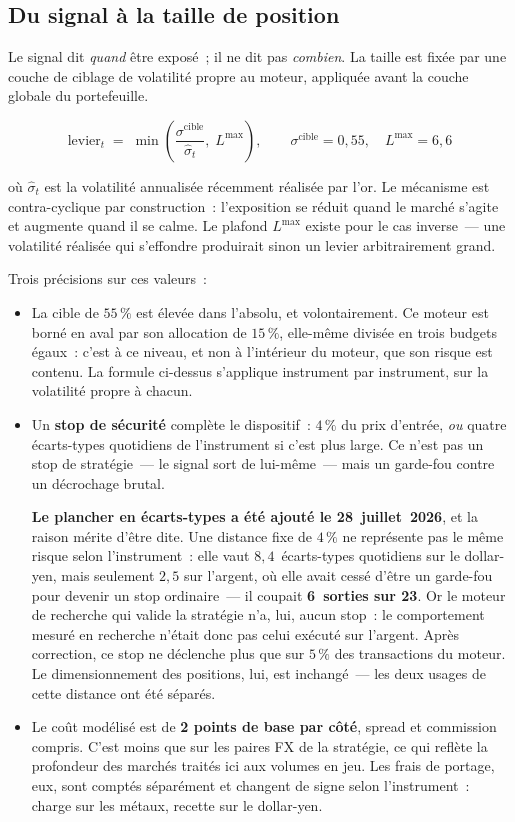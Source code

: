 \subsection{Du signal à la taille de position}

Le signal dit \emph{quand} être exposé~; il ne dit pas \emph{combien}. La taille est fixée par une couche de ciblage de volatilité propre au moteur, appliquée avant la couche globale du portefeuille.

\begin{equation*}
\text{levier}_t \;=\; \min\!\left(\frac{\sigma^{\text{cible}}}{\hat{\sigma}_t},\; L^{\max}\right),
\qquad \sigma^{\text{cible}} = 0{,}55, \quad L^{\max} = 6{,}6
\end{equation*}

où $\hat{\sigma}_t$ est la volatilité annualisée récemment réalisée par l'or. Le mécanisme est contra-cyclique par construction~: l'exposition se réduit quand le marché s'agite et augmente quand il se calme. Le plafond $L^{\max}$ existe pour le cas inverse~--- une volatilité réalisée qui s'effondre produirait sinon un levier arbitrairement grand.

Trois précisions sur ces valeurs~:

\begin{itemize}
\item La cible de $55\,\%$ est élevée dans l'absolu, et volontairement. Ce moteur est borné en aval par son allocation de $15\,\%$, elle-même divisée en trois budgets égaux~: c'est à ce niveau, et non à l'intérieur du moteur, que son risque est contenu. La formule ci-dessus s'applique instrument par instrument, sur la volatilité propre à chacun.
\item Un \textbf{stop de sécurité} complète le dispositif~: $4\,\%$ du prix d'entrée, \emph{ou} quatre écarts-types quotidiens de l'instrument si c'est plus large. Ce n'est pas un stop de stratégie~--- le signal sort de lui-même~--- mais un garde-fou contre un décrochage brutal.

\textbf{Le plancher en écarts-types a été ajouté le 28~juillet~2026}, et la raison mérite d'être dite. Une distance fixe de $4\,\%$ ne représente pas le même risque selon l'instrument~: elle vaut $8{,}4$~écarts-types quotidiens sur le dollar-yen, mais seulement $2{,}5$ sur l'argent, où elle avait cessé d'être un garde-fou pour devenir un stop ordinaire~--- il coupait \textbf{6~sorties sur 23}. Or le moteur de recherche qui valide la stratégie n'a, lui, aucun stop~: le comportement mesuré en recherche n'était donc pas celui exécuté sur l'argent. Après correction, ce stop ne déclenche plus que sur $5\,\%$ des transactions du moteur. Le dimensionnement des positions, lui, est inchangé~--- les deux usages de cette distance ont été séparés.
\item Le coût modélisé est de \textbf{2 points de base par côté}, spread et commission compris. C'est moins que sur les paires FX de la stratégie, ce qui reflète la profondeur des marchés traités ici aux volumes en jeu. Les frais de portage, eux, sont comptés séparément et changent de signe selon l'instrument~: charge sur les métaux, recette sur le dollar-yen.
\end{itemize}

